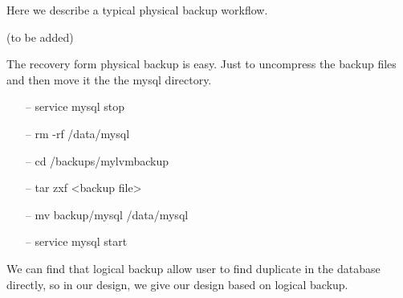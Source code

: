 Here we describe a typical physical backup workflow. 

(to be added)

The recovery form physical backup is easy. Just to uncompress the backup files and then move it the the mysql directory. 


\begin{itemize}
\item[--] service mysql stop
\item[--] rm -rf /data/mysql
\item[--] cd /backups/mylvmbackup
\item[--] tar zxf <backup file>
\item[--] mv backup/mysql /data/mysql
\item[--] service mysql start
\end{itemize}


We can find that logical backup allow user to find duplicate in the database directly, so in our design, we give our design based on logical backup.



